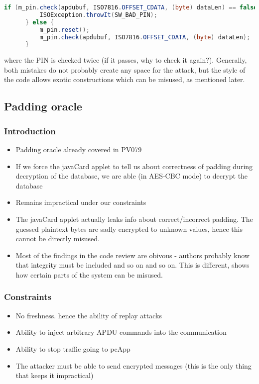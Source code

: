 \documentclass[11pt,a4paper]{article}
\begin{document}
\begin{lstlisting}[language=java]
if (m_pin.check(apdubuf, ISO7816.OFFSET_CDATA, (byte) dataLen) == false) { 
          ISOException.throwIt(SW_BAD_PIN);
      } else {
          m_pin.reset();
          m_pin.check(apdubuf, ISO7816.OFFSET_CDATA, (byte) dataLen);
      }
\end{lstlisting}

where the PIN is checked twice (if it passes, why to check it again?). Generally, both mistakes do not probably create any space for the attack, but the style of the code allows exotic constructions which can be misused, as mentioned later.


\subsection*{Padding oracle}

\subsubsection*{Introduction}

\begin{itemize}
\item  Padding oracle already covered in PV079
\item If we force the javaCard applet to tell us about correctness of padding during decryption of the database, we are able (in AES-CBC mode) to decrypt the database
\item Remains impractical under our constraints
\item The javaCard applet actually leaks info about correct/incorrect padding. The guessed plaintext bytes are sadly encrypted to unknown values, hence this cannot be directly misused. 
\item Most of the findings in the code review are obivous - authors probably know that integrity must be included and so on and so on. This is different, shows how certain parts of the system can be misused. 
\end{itemize}

\subsubsection*{Constraints}
\begin{itemize}
\item No freshness. hence the ability of replay attacks
\item Ability to inject arbitrary APDU commands into the communication
\item Ability to stop traffic going to pcApp
\item The attacker must be able to send encrypted messages (this is the only thing that keeps it impractical)
\end{itemize}
\end{document}
